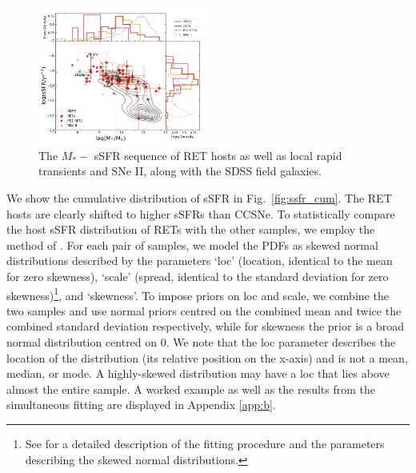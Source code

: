 \documentclass[fleqn,usenatbib,]{mnras}
\begin{document}
\begin{figure}
\includegraphics[width=0.5\textwidth]{figs/sSFR_Mike_RETs.png}
\caption{The $M_* -$ sSFR sequence of RET hosts as well as local rapid transients and SNe II, along with the SDSS field galaxies.
\label{fig:sfms_ssfr}}
\end{figure}

We show the cumulative distribution of sSFR in Fig.~\ref{fig:ssfr_cum}. The RET hosts are clearly shifted to higher sSFRs than CCSNe. To statistically compare the host sSFR distribution of RETs with the other samples, we employ the method of . For each pair of samples, we model the PDFs as skewed normal distributions described by the parameters `loc' (location, identical to the mean for zero skewness), `scale' (spread, identical to the standard deviation for zero skewness)\footnote{See  for a detailed description of the fitting procedure and the parameters describing the skewed normal distributions.}, and `skewness'. To impose priors on loc and scale, we combine the two samples and use normal priors centred on the combined mean and twice the combined standard deviation respectively, while for skewness the prior is a broad normal distribution centred on 0. We note that the loc parameter describes the location of the distribution (its relative position on the x-axis) and is not a mean, median, or mode. A highly-skewed distribution may have a loc that lies above almost the entire sample. A worked example as well as the results from the simultaneous fitting are displayed in Appendix \ref{app:b}.
\end{document}
